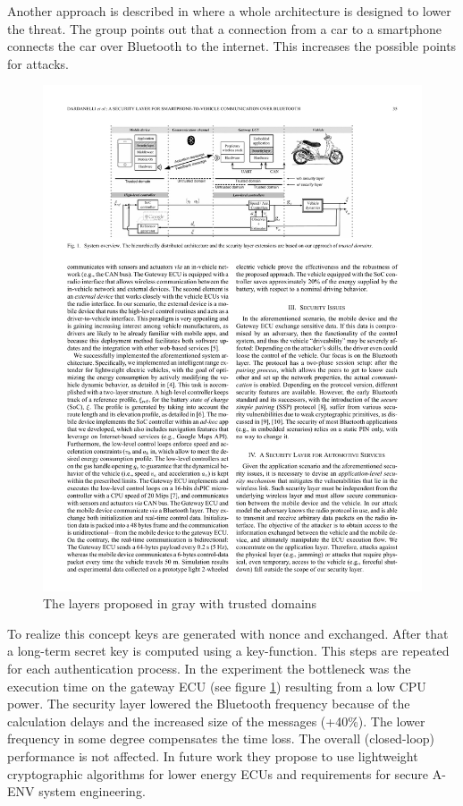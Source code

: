 \documentclass[12pt,a4paper]{article}
\begin{document}
Another approach is described in \cite{DBLP:journals/esl/DardanelliMTZSKH13} where a whole architecture is designed to lower the threat. The group points out that a connection from a car to a smartphone connects the car over Bluetooth to the internet. This increases the possible points for attacks.\\

\begin{figure}[h]
\begin{center}
	\includegraphics{img/security_layer_bt}
\caption{The layers proposed in gray with trusted domains   \cite{DBLP:journals/esl/DardanelliMTZSKH13}}
\label{img_bt_attack_bluesnarfer}
\end{center}
\end{figure}
To realize this concept keys are generated with nonce and exchanged. After that a long-term secret key is computed using a key-function. This steps are repeated for each authentication process. In the experiment the bottleneck was the execution time on the gateway ECU (see figure \ref{img_bt_attack_bluesnarfer}) resulting from a low CPU power. The security layer lowered the Bluetooth frequency because of the calculation delays and the increased size of the messages (+40\%). The lower frequency in some degree compensates the time loss. The overall (closed-loop) performance is not affected. In future work they propose to use lightweight cryptographic algorithms for lower energy ECUs and requirements for secure A-ENV system engineering.
\end{document}
